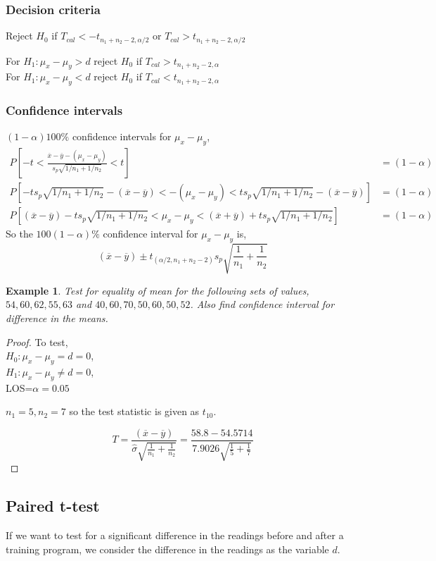 \documentclass[oneside,11pt,pdftex]{book}%
\numberwithin{equation}{section}
\newtheorem{example}[theorem]{Example}
\numberwithin{section}{chapter}
\numberwithin{equation}{chapter}
\begin{document}
\subsubsection{Decision criteria}
Reject $ H_0 $ if $ T_{cal} < -t_{n_1+n_2-2,\alpha/2}$ or $ T_{cal}>t_{n_1+n_2-2,\alpha/2} $


For $ H_1: \mu_x-\mu_y>d $ reject $ H_0 $ if $ T_{cal} >t_{n_1+n_2-2,\alpha}$\\
For $ H_1: \mu_x-\mu_y<d $ reject $ H_0 $ if $ T_{cal} <t_{n_1+n_2-2,\alpha}$

\subsubsection{Confidence intervals}
$ (1-\alpha)100\% $ confidence intervals for $ \mu_x-\mu_y $,
\begin{align*}
	P\left[-t < \frac{\overline{x}-\overline{y}-(\mu_x-\mu_y)}{s_p \sqrt{1/n_1+1/n_2}}<t\right]&=(1-\alpha)\\
	P\left[-t s_p \sqrt{1/n_1+1/n_2}-(\overline{x}-\overline{y}) < -(\mu_x-\mu_y) < t s_p \sqrt{1/n_1+1/n_2}-(\overline{x}-\overline{y})\right]&=(1-\alpha)\\
	P\left[(\overline{x}-\overline{y})-t s_p \sqrt{1/n_1+1/n_2} < \mu_x-\mu_y < (\overline{x}+\overline{y})+t s_p \sqrt{1/n_1+1/n_2}\right]&=(1-\alpha)
\end{align*}
So the $ 100(1-\alpha)\% $ confidence interval for $ \mu_x-\mu_y  $ is,
\[ (\overline{x}-\overline{y})\pm t_{(\alpha/2, n_1+n_2-2)}s_p \sqrt{\frac{1}{n_1}+\frac{1}{n_2}} \]


\begin{example}
	Test for equality of mean for the following sets of values,
	$ 54, 60, 62, 55, 63 $ and $ 40, 60, 70, 50, 60, 50, 52 $. Also find confidence interval for difference in the means.
\end{example}
\begin{proof}
	To test,\\
	$ H_0:\mu_x-\mu_y=d=0$,\\
	$ H_1:\mu_x - \mu_y \neq d=0 $,\\
	LOS=$ \alpha=0.05 $
	
	
	$ n_1=5, n_2=7 $ so the test statistic is given as $ t_{10} $.
	
	\[ T=\frac{(\overline{x}-\overline{y})}{\hat{\sigma}\sqrt{\frac{1}{n_1}+\frac{1}{n_2}}} = \frac{58.8-54.5714}{7.9026 \sqrt{\frac{1}{5}+\frac{1}{7}}}\]
\end{proof}

\subsection{Paired t-test}
If we want to test for a significant difference in the readings before and after a training program, we consider the difference in the readings as the variable $ d $.
\end{document}

